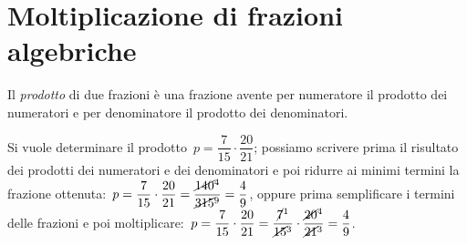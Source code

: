 \section{Moltiplicazione di frazioni algebriche}

Il \emph{prodotto} di due frazioni è una frazione avente per numeratore il prodotto dei numeratori e per denominatore il prodotto dei denominatori.

Si vuole determinare il prodotto~$p=\dfrac{7}{15}\cdot \dfrac{20}{21}$; possiamo scrivere prima il risultato dei prodotti
dei numeratori e dei denominatori e poi ridurre ai minimi termini la frazione
ottenuta:~$p=\dfrac{7}{15}\cdot \dfrac{20}{21}=\dfrac{\cancel{140}^4}{\cancel{315}^9}=\dfrac{4}{9}$,
oppure prima semplificare i termini delle frazioni e poi
moltiplicare:~$p=\dfrac{7}{15}\cdot \dfrac{20}{21}=\dfrac{\cancel{7}^1}{\cancel{15}^3}\cdot \dfrac{\cancel{20}^4}{\cancel{21}^3}=\dfrac{4}{9}$.

